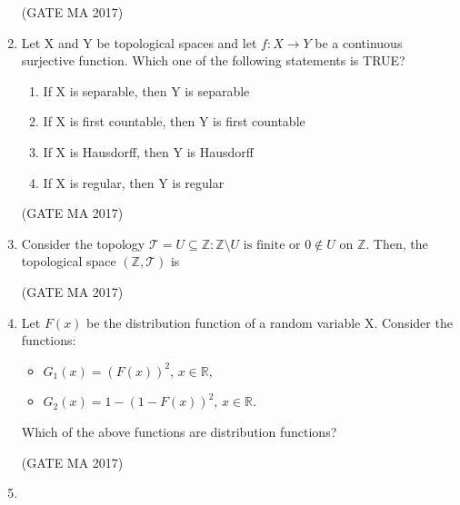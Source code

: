 \documentclass[journal,12pt,onecolumn]{IEEEtran}
\theoremstyle{remark}
\begin{document}
\begin{enumerate}
\begin{enumerate}
\begin{multicols}{2}
\end{multicols}
\end{enumerate}
\hfill (GATE MA 2017)
\item
Let X and Y be topological spaces and let $f: X \to Y$ be a continuous surjective function. Which one of the following statements is TRUE?
\begin{enumerate}
\item If X is separable, then Y is separable
\item If X is first countable, then Y is first countable
\item If X is Hausdorff, then Y is Hausdorff
\item If X is regular, then Y is regular
\end{enumerate}
\hfill (GATE MA 2017)
\item
Consider the topology $\mathcal{T} = {U \subseteq \mathbb{Z} : \mathbb{Z} \setminus U \text{ is finite or } 0 \notin U}$ on $\mathbb{Z}$. Then, the topological space $(\mathbb{Z}, \mathcal{T})$ is
\begin{enumerate}
\end{enumerate}
\hfill (GATE MA 2017)
\item
Let $F(x)$ be the distribution function of a random variable X. Consider the functions:
\begin{itemize}
\item[] $G_1(x) = (F(x))^2$, $x \in \mathbb{R}$,
\item[] $G_2(x) = 1 - (1-F(x))^2$, $x \in \mathbb{R}$.
\end{itemize}
Which of the above functions are distribution functions?
\begin{enumerate}
\end{enumerate}
\hfill (GATE MA 2017)
\item

\end{enumerate}
\end{document}
